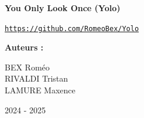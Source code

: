\begin{titlepage}
    \vspace*{1cm}
    
        \begin{center}
         
            \Huge
    
    \hrulefill
            
            \textbf{You Only Look Once (Yolo)}
    
    \hrulefill

            \vspace{0.5cm}
                
            \large
            \href{https://github.com/RomeoBex/Yolo}{\texttt{https://github.com/RomeoBex/Yolo}}
        
                
                        
            \vspace{2cm}
    
            \Large
            \begin{minipage}[t]{0.4\textwidth}
                 \textbf{Auteurs :}
            \end{minipage}
            \hfill
            \begin{minipage}[t]{0.45\textwidth}
                \raggedleft
                BEX Roméo\\
                RIVALDI Tristan\\ 
                LAMURE Maxence
            \end{minipage}
                
                
            \vspace{9cm}
            \large
            2024 - 2025
                
        \end{center}
    \end{titlepage}